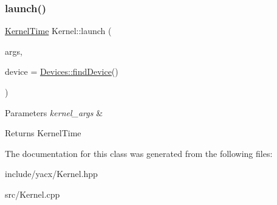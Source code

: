 \subsubsection{\texorpdfstring{launch()}{launch()}}
{\footnotesize\ttfamily \hyperlink{structyacx_1_1_kernel_time_struct}{Kernel\+Time} Kernel\+::launch (\begin{DoxyParamCaption}\item[{\hyperlink{classyacx_1_1_kernel_args}{Kernel\+Args}}]{args,  }\item[{\hyperlink{classyacx_1_1_device}{Device} \&}]{device = {\ttfamily \hyperlink{classyacx_1_1_devices_abaae9839d12e79117e2fb292ee0689fb}{Devices\+::find\+Device}()} }\end{DoxyParamCaption})}


\begin{DoxyParams}{Parameters}
{\em kernel\+\_\+args} & \\
\hline
\end{DoxyParams}
\begin{DoxyReturn}{Returns}
Kernel\+Time 
\end{DoxyReturn}


The documentation for this class was generated from the following files\+:\begin{DoxyCompactItemize}
\item 
include/yacx/Kernel.\+hpp\item 
src/Kernel.\+cpp\end{DoxyCompactItemize}
